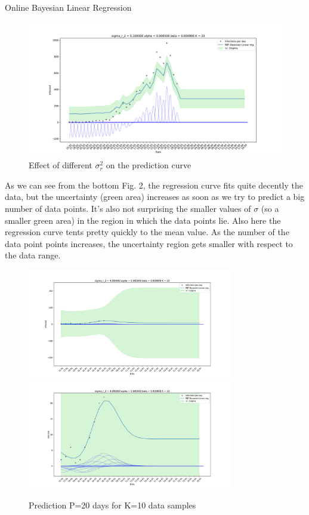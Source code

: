 \documentclass[english]{exercisesheet}
\begin{document}
\begin{nexercise}{Online Bayesian Linear Regression}
\begin{solution}
\begin{figure}
        \includegraphics[width=1\textwidth]{2.pdf}
        \caption{Effect of different $\sigma_{r}^{2}$ on the prediction curve}
        \end{figure}
        \cleardoublepage
       As we can see from the bottom Fig. 2, the regression curve fits quite decently the data, but the uncertainty (green area) increases as soon as we try to predict a big number of data points. It's also not surprising the smaller values of $\sigma$ (so a smaller green area) in the region in which the data points lie. Also here the regression curve tents pretty quickly to the mean value.
       As the number of the data point points increases, the uncertainty region gets smaller with respect to the data range.
        \begin{figure}
        \includegraphics[width=0.8\textwidth]{3.pdf}
        \includegraphics[width=0.8\textwidth]{4.pdf}
        \caption{Prediction P=20 days for K=10 data samples}
        

\end{figure}
\end{solution}
\end{nexercise}
\end{document}
